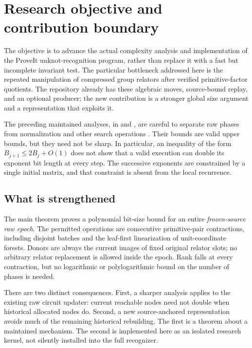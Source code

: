 \documentclass[11pt,letterpaper]{article}
\theoremstyle{definition}
\theoremstyle{remark}\newtheorem{remark}[theorem]{Remark}
\begin{document}
\section{Research objective and contribution boundary}

The objective is to advance the actual complexity analysis and implementation
of the ProveIt unknot-recognition program, rather than replace it with a
fast but incomplete invariant test. The particular bottleneck addressed here
is the repeated manipulation of compressed group relators after verified
primitive-factor quotients. The repository already has these algebraic moves,
source-bound replay, and an optional producer; the new contribution is a
stronger global size argument and a representation that exploits it.

The preceding maintained analyses, in
 and
, are careful to separate raw phases from
normalization and other search operations \cite{repo-projection,repo-forest}.
Their bounds are valid upper bounds, but they need not be sharp. In particular,
an inequality of the form $B_{j+1}\le 2B_j+O(1)$ does not show that a valid
execution can double its exponent bit length at every step. The successive
exponents are constrained by a single initial matrix, and that constraint
is absent from the local recurrence.

\subsection{What is strengthened}

The main theorem proves a polynomial bit-size bound for an entire
\emph{frozen-source raw epoch}. The permitted operations are consecutive
primitive-pair contractions, including disjoint batches and the leaf-first
linearization of unit-coordinate forests. Donors are always the current
images of fixed original relator slots; no arbitrary relator replacement is
allowed inside the epoch. Rank falls at every contraction, but no logarithmic
or polylogarithmic bound on the number of phases is needed.

There are two distinct consequences. First, a sharper analysis applies to the
existing raw circuit updater: current reachable nodes need not double when
historical allocated nodes do. Second, a new source-anchored representation
avoids much of the remaining historical rebuilding. The first is a theorem
about a maintained mechanism. The second is implemented here as an isolated
research kernel, not silently installed into the full recognizer.
\end{document}
